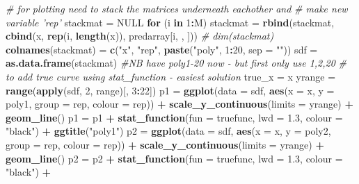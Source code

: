 \documentclass[]{article}
\newenvironment{Shaded}{\begin{snugshade}}{\end{snugshade}}
\newcommand{\CommentTok}[1]{\textcolor[rgb]{0.56,0.35,0.01}{\textit{#1}}}
\newcommand{\ControlFlowTok}[1]{\textcolor[rgb]{0.13,0.29,0.53}{\textbf{#1}}}
\newcommand{\DataTypeTok}[1]{\textcolor[rgb]{0.13,0.29,0.53}{#1}}
\newcommand{\DecValTok}[1]{\textcolor[rgb]{0.00,0.00,0.81}{#1}}
\newcommand{\FloatTok}[1]{\textcolor[rgb]{0.00,0.00,0.81}{#1}}
\newcommand{\KeywordTok}[1]{\textcolor[rgb]{0.13,0.29,0.53}{\textbf{#1}}}
\newcommand{\NormalTok}[1]{#1}
\newcommand{\OperatorTok}[1]{\textcolor[rgb]{0.81,0.36,0.00}{\textbf{#1}}}
\newcommand{\OtherTok}[1]{\textcolor[rgb]{0.56,0.35,0.01}{#1}}
\newcommand{\StringTok}[1]{\textcolor[rgb]{0.31,0.60,0.02}{#1}}
\begin{document}
\begin{Shaded}
\begin{Highlighting}[]
\CommentTok{# for plotting need to stack the matrices underneath eachother and}
\CommentTok{# make new variable 'rep'}
\NormalTok{stackmat =}\StringTok{ }\OtherTok{NULL}
\ControlFlowTok{for}\NormalTok{ (i }\ControlFlowTok{in} \DecValTok{1}\OperatorTok{:}\NormalTok{M) stackmat =}\StringTok{ }\KeywordTok{rbind}\NormalTok{(stackmat, }\KeywordTok{cbind}\NormalTok{(x, }\KeywordTok{rep}\NormalTok{(i, }\KeywordTok{length}\NormalTok{(x)), }
\NormalTok{    predarray[i, , ]))}
\CommentTok{# dim(stackmat)}
\KeywordTok{colnames}\NormalTok{(stackmat) =}\StringTok{ }\KeywordTok{c}\NormalTok{(}\StringTok{"x"}\NormalTok{, }\StringTok{"rep"}\NormalTok{, }\KeywordTok{paste}\NormalTok{(}\StringTok{"poly"}\NormalTok{, }\DecValTok{1}\OperatorTok{:}\DecValTok{20}\NormalTok{, }\DataTypeTok{sep =} \StringTok{""}\NormalTok{))}
\NormalTok{sdf =}\StringTok{ }\KeywordTok{as.data.frame}\NormalTok{(stackmat)  }\CommentTok{#NB have poly1-20 now - but first only use 1,2,20}
\CommentTok{# to add true curve using stat_function - easiest solution}
\NormalTok{true_x =}\StringTok{ }\NormalTok{x}
\NormalTok{yrange =}\StringTok{ }\KeywordTok{range}\NormalTok{(}\KeywordTok{apply}\NormalTok{(sdf, }\DecValTok{2}\NormalTok{, range)[, }\DecValTok{3}\OperatorTok{:}\DecValTok{22}\NormalTok{])}
\NormalTok{p1 =}\StringTok{ }\KeywordTok{ggplot}\NormalTok{(}\DataTypeTok{data =}\NormalTok{ sdf, }\KeywordTok{aes}\NormalTok{(}\DataTypeTok{x =}\NormalTok{ x, }\DataTypeTok{y =}\NormalTok{ poly1, }\DataTypeTok{group =}\NormalTok{ rep, }\DataTypeTok{colour =}\NormalTok{ rep)) }\OperatorTok{+}\StringTok{ }
\StringTok{    }\KeywordTok{scale_y_continuous}\NormalTok{(}\DataTypeTok{limits =}\NormalTok{ yrange) }\OperatorTok{+}\StringTok{ }\KeywordTok{geom_line}\NormalTok{()}
\NormalTok{p1 =}\StringTok{ }\NormalTok{p1 }\OperatorTok{+}\StringTok{ }\KeywordTok{stat_function}\NormalTok{(}\DataTypeTok{fun =}\NormalTok{ truefunc, }\DataTypeTok{lwd =} \FloatTok{1.3}\NormalTok{, }\DataTypeTok{colour =} \StringTok{"black"}\NormalTok{) }\OperatorTok{+}\StringTok{ }
\StringTok{    }\KeywordTok{ggtitle}\NormalTok{(}\StringTok{"poly1"}\NormalTok{)}
\NormalTok{p2 =}\StringTok{ }\KeywordTok{ggplot}\NormalTok{(}\DataTypeTok{data =}\NormalTok{ sdf, }\KeywordTok{aes}\NormalTok{(}\DataTypeTok{x =}\NormalTok{ x, }\DataTypeTok{y =}\NormalTok{ poly2, }\DataTypeTok{group =}\NormalTok{ rep, }\DataTypeTok{colour =}\NormalTok{ rep)) }\OperatorTok{+}\StringTok{ }
\StringTok{    }\KeywordTok{scale_y_continuous}\NormalTok{(}\DataTypeTok{limits =}\NormalTok{ yrange) }\OperatorTok{+}\StringTok{ }\KeywordTok{geom_line}\NormalTok{()}
\NormalTok{p2 =}\StringTok{ }\NormalTok{p2 }\OperatorTok{+}\StringTok{ }\KeywordTok{stat_function}\NormalTok{(}\DataTypeTok{fun =}\NormalTok{ truefunc, }\DataTypeTok{lwd =} \FloatTok{1.3}\NormalTok{, }\DataTypeTok{colour =} \StringTok{"black"}\NormalTok{) }\OperatorTok{+}\StringTok{ }

\end{Highlighting}
\end{Shaded}
\end{document}

